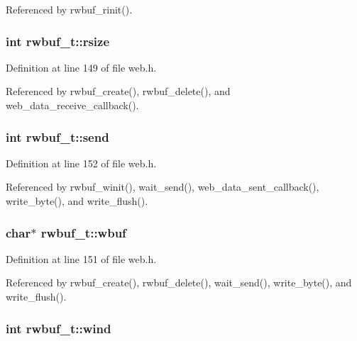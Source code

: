 Referenced by rwbuf\-\_\-rinit().

\hypertarget{structrwbuf__t_aa4094c7e329ae85cc50dbd06d3b50d44}{
\subsubsection[{rsize}]{\setlength{\rightskip}{0pt plus 5cm}int rwbuf\-\_\-t\-::rsize}}\label{structrwbuf__t_aa4094c7e329ae85cc50dbd06d3b50d44}


Definition at line 149 of file web.\-h.



Referenced by rwbuf\-\_\-create(), rwbuf\-\_\-delete(), and web\-\_\-data\-\_\-receive\-\_\-callback().

\hypertarget{structrwbuf__t_a279490994b6576ad00900254a8c07a89}{
\subsubsection[{send}]{\setlength{\rightskip}{0pt plus 5cm}int rwbuf\-\_\-t\-::send}}\label{structrwbuf__t_a279490994b6576ad00900254a8c07a89}


Definition at line 152 of file web.\-h.



Referenced by rwbuf\-\_\-winit(), wait\-\_\-send(), web\-\_\-data\-\_\-sent\-\_\-callback(), write\-\_\-byte(), and write\-\_\-flush().

\hypertarget{structrwbuf__t_a68386231f3d907ec4508c090925782a2}{
\subsubsection[{wbuf}]{\setlength{\rightskip}{0pt plus 5cm}char$\ast$ rwbuf\-\_\-t\-::wbuf}}\label{structrwbuf__t_a68386231f3d907ec4508c090925782a2}


Definition at line 151 of file web.\-h.



Referenced by rwbuf\-\_\-create(), rwbuf\-\_\-delete(), wait\-\_\-send(), write\-\_\-byte(), and write\-\_\-flush().

\hypertarget{structrwbuf__t_a135345eee44e93f37e57dbabec12c339}{
\subsubsection[{wind}]{\setlength{\rightskip}{0pt plus 5cm}int rwbuf\-\_\-t\-::wind}}\label{structrwbuf__t_a135345eee44e93f37e57dbabec12c339}


